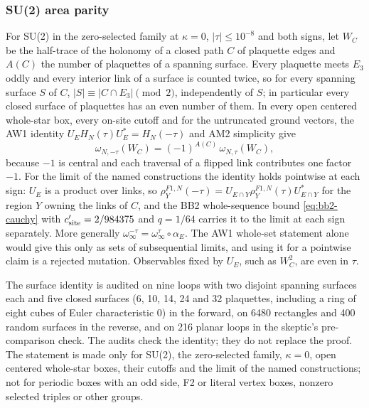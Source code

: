 \subsubsection{SU(2) area parity}
\label{sec:bd1-area}
For SU(2) in the zero-selected family at $\kappa=0$, $|\tau|\le10^{-8}$ and
both signs, let $W_C$ be the half-trace of the holonomy of a closed path $C$
of plaquette edges and $A(C)$ the number of plaquettes of a spanning
surface. Every plaquette meets $E_3$ oddly and every interior link of a
surface is counted twice, so for every spanning surface $S$ of $C$,
$|S|\equiv|C\cap E_3|\pmod2$, independently of $S$; in particular every closed
surface of plaquettes has an even number of them. In every open centered
whole-star box, every on-site cutoff and for the untruncated ground vectors,
the AW1 identity $U_EH_N(\tau)U_E^*=H_N(-\tau)$ and AM2 simplicity give
\begin{equation}
 \omega_{N,-\tau}(W_C)=(-1)^{A(C)}\,\omega_{N,\tau}(W_C),
 \label{eq:bd1-area}
\end{equation}
because $-1$ is central and each traversal of a flipped link contributes one
factor $-1$. For the limit of the named constructions the identity holds
pointwise at each sign: $U_E$ is a product over links, so
$\rho^{F1,N}_Y(-\tau)=U_{E\cap Y}\rho^{F1,N}_Y(\tau)U_{E\cap Y}^*$ for the region
$Y$ owning the links of $C$, and the BB2 whole-sequence bound
\eqref{eq:bb2-cauchy} with $c'_{\rm site}=2/984375$ and $q=1/64$ carries it to
the limit at each sign separately. More generally
$\omega^{-\tau}_\infty=\omega^{\tau}_\infty\circ\alpha_E$. The AW1 whole-set
statement alone would give this only as sets of subsequential limits, and
using it for a pointwise claim is a rejected mutation. Observables fixed by
$U_E$, such as $W_C^2$, are even in $\tau$.

The surface identity is audited on nine loops with two disjoint spanning
surfaces each and five closed surfaces (6, 10, 14, 24 and 32 plaquettes,
including a ring of eight cubes of Euler characteristic 0) in the forward, on
6480 rectangles and 400 random surfaces in the reverse, and on 216 planar
loops in the skeptic's pre-comparison check. The audits check the identity;
they do not replace the proof. The statement is made only for SU(2), the
zero-selected family, $\kappa=0$, open centered whole-star boxes, their
cutoffs and the limit of the named constructions; not for periodic boxes with
an odd side, F2 or literal vertex boxes, nonzero selected triples or other
groups.

